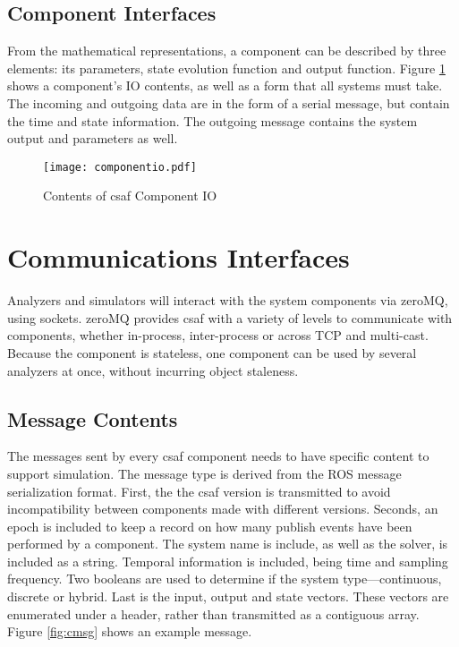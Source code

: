 \subsection{Component Interfaces}

From the mathematical representations, a component can be described by three elements: its parameters, state evolution function and output function. Figure \ref{fig:cio} shows a component's IO contents, as well as a form that all systems must take. The incoming and outgoing data are in the form of a serial message, but contain the time and state information. The outgoing message contains the system output and parameters as well.

\begin{figure}
\centering
\texttt{[image: componentio.pdf]}
\caption{Contents of \acrshort{csaf}  Component IO}
\label{fig:cio}
\end{figure}

\section{Communications Interfaces}

Analyzers and simulators will interact with the system components via zeroMQ, using sockets. zeroMQ provides \acrshort{csaf}  with a variety of levels to communicate with components, whether in-process, inter-process or across TCP and multi-cast. Because the component is stateless, one component can be used by several analyzers at once, without incurring object staleness.

\subsection{Message Contents}

The messages sent by every \acrshort{csaf}  component needs to have specific content to support simulation. The message type is derived from the ROS message serialization format. First, the the \acrshort{csaf}  version is transmitted to avoid incompatibility between components made with different versions. Seconds, an epoch is included to keep a record on how many publish events have been performed by a component. The system name is include, as well as the solver, is included as a string. Temporal information is included, being time and sampling frequency. Two booleans are used to determine if the system type---continuous, discrete or hybrid. Last is the input, output and state vectors. These vectors are enumerated under a header, rather than transmitted as a contiguous array. Figure \ref{fig:cmsg} shows an example message.

